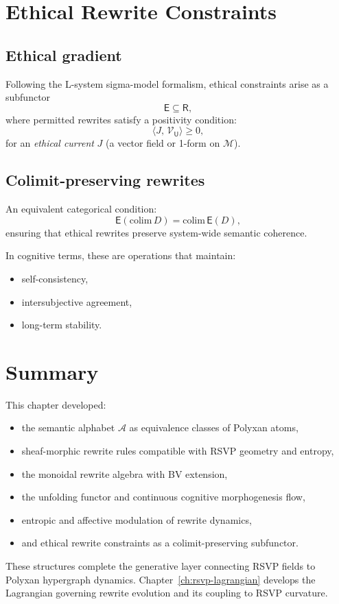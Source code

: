 \section{Ethical Rewrite Constraints}

\subsection{Ethical gradient}

Following the L-system sigma-model formalism, ethical constraints arise as a
subfunctor
\[
\mathsf{E} \subseteq \mathsf{R},
\]
where permitted rewrites satisfy a positivity condition:
\[
\langle J,\,\mathcal{V}_{\mathsf{U}}\rangle \ge 0,
\]
for an \emph{ethical current} $J$ (a vector field or 1-form on $\mathcal{M}$).

\subsection{Colimit-preserving rewrites}

An equivalent categorical condition:
\[
\mathsf{E}(\mathrm{colim}\,D) = \mathrm{colim}\,\mathsf{E}(D),
\]
ensuring that ethical rewrites preserve system-wide semantic coherence.

In cognitive terms, these are operations that maintain:
\begin{itemize}
  \item self-consistency,
  \item intersubjective agreement,
  \item long-term stability.
\end{itemize}

\section{Summary}

This chapter developed:
\begin{itemize}
  \item the semantic alphabet $\mathcal{A}$ as equivalence classes of Polyxan atoms,
  \item sheaf-morphic rewrite rules compatible with RSVP geometry and entropy,
  \item the monoidal rewrite algebra with BV extension,
  \item the unfolding functor and continuous cognitive morphogenesis flow,
  \item entropic and affective modulation of rewrite dynamics,
  \item and ethical rewrite constraints as a colimit-preserving subfunctor.
\end{itemize}

These structures complete the generative layer connecting RSVP fields to Polyxan
hypergraph dynamics. Chapter~\ref{ch:rsvp-lagrangian} develops the Lagrangian
governing rewrite evolution and its coupling to RSVP curvature.
